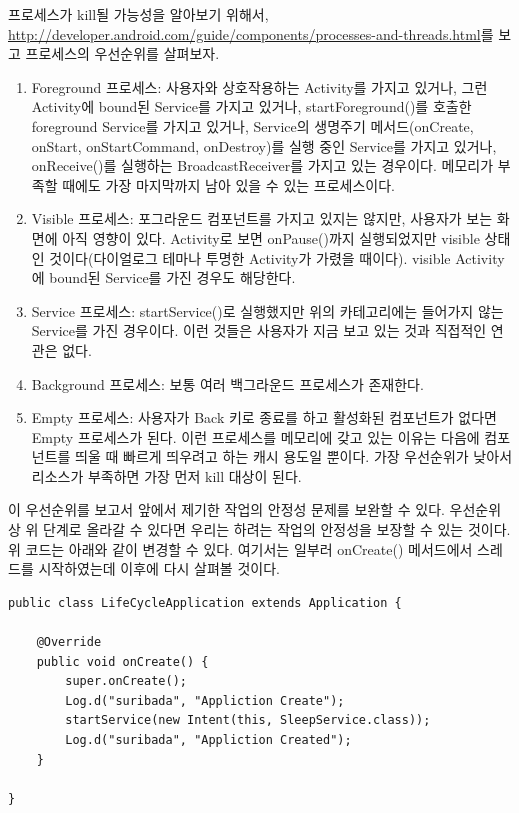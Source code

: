 프로세스가 kill될 가능성을 알아보기 위해서, 
\url{http://developer.android.com/guide/components/processes-and-threads.html}를 보고 프로세스의 우선순위를 살펴보자.
\begin{enumerate}
\item Foreground 프로세스: 사용자와 상호작용하는 Activity를 가지고 있거나, 그런 Activity에 bound된 Service를 가지고 있거나, startForeground()를 호출한 foreground Service를 가지고 있거나, Service의 생명주기 메서드(onCreate, onStart, onStartCommand, onDestroy)를 실행 중인 Service를 가지고 있거나, onReceive()를 실행하는 BroadcastReceiver를 가지고 있는 경우이다.
메모리가 부족할 때에도 가장 마지막까지 남아 있을 수 있는 프로세스이다.
\item Visible 프로세스: 포그라운드 컴포넌트를 가지고 있지는 않지만, 사용자가 보는 화면에 아직 영향이 있다. Activity로 보면 onPause()까지 실행되었지만 visible 상태인 것이다(다이얼로그 테마나 투명한 Activity가 가렸을 때이다).
visible Activity에 bound된 Service를 가진 경우도 해당한다. 
\item Service 프로세스: startService()로 실행했지만 위의 카테고리에는 들어가지 않는 Service를 가진 경우이다. 이런 것들은 사용자가 지금 보고 있는 것과 직접적인 연관은 없다.
\item Background 프로세스: 보통 여러 백그라운드 프로세스가 존재한다.
\item Empty 프로세스: 사용자가 Back 키로 종료를 하고 활성화된 컴포넌트가 없다면 Empty 프로세스가 된다. 이런 프로세스를 메모리에 갖고 있는 이유는 다음에 컴포넌트를 띄울 때 빠르게 띄우려고 하는 캐시 용도일 뿐이다. 가장 우선순위가 낮아서 리소스가 부족하면 가장 먼저 kill 대상이 된다.
\end{enumerate}

이 우선순위를 보고서 앞에서 제기한 작업의 안정성 문제를 보완할 수 있다. 우선순위상 위 단계로 올라갈 수 있다면 우리는 하려는 작업의 안정성을 보장할 수 있는 것이다. 
위 코드는 아래와 같이 변경할 수 있다. 여기서는 일부러 onCreate() 메서드에서 스레드를 시작하였는데 이후에 다시 살펴볼 것이다.

\begin{lstlisting}[frame=single]
public class LifeCycleApplication extends Application {
		
	@Override
	public void onCreate() {
		super.onCreate();
		Log.d("suribada", "Appliction Create");
		startService(new Intent(this, SleepService.class));
		Log.d("suribada", "Appliction Created");
	}

}
\end{lstlisting}

